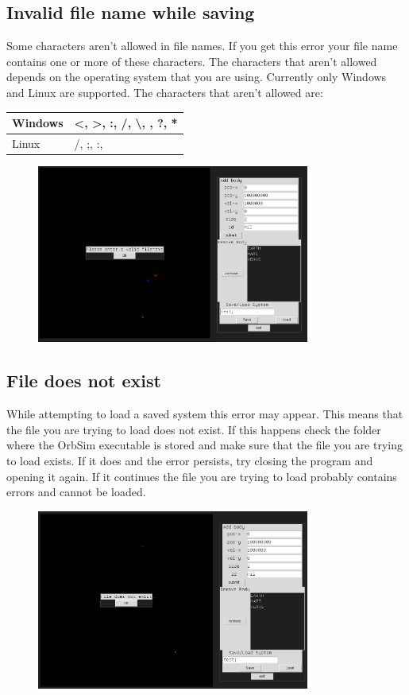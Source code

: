 \documentclass[a4paper,11pt,titlepage]{article}
\begin{document}
\subsection{Invalid file name while saving}
Some characters aren't allowed in file names. If you get this error your file
name contains one or more of these characters. The characters that aren't
allowed depends on the operating system that you are using. Currently only
Windows and Linux are supported. The characters that aren't allowed are: \\

\begin{tabular}{l|l}
	Windows & \textless, \textgreater, :, /, \textbackslash{}, \textbar, ?,
	* \\ \hline 
	Linux & /, ;, :, \textbar
\end{tabular}
\begin{figure}[H]
	\centering
	\includegraphics[width=0.8\textwidth]{../img/save.png}
\end{figure}

\subsection{File does not exist}
While attempting to load a saved system this error may appear. This means that
the file you are trying to load does not exist. If this happens check the folder
where the OrbSim executable is stored and make sure that the file you are trying
to load exists. If it does and the error persists, try closing the program and
opening it again. If it continues the file you are trying to load probably
contains errors and cannot be loaded.
\begin{figure}[H]
	\centering
	\includegraphics[width=0.8\textwidth]{../img/load.png}
\end{figure}
\end{document}
